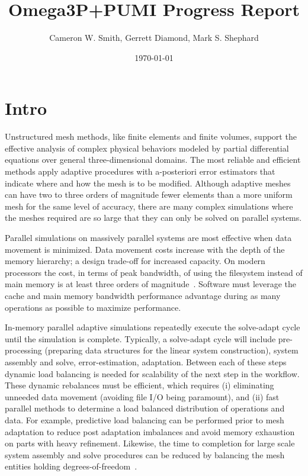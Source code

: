 \documentclass[a4paper]{article}
\title{Omega3P+PUMI Progress Report}
\author{Cameron W. Smith, Gerrett Diamond, Mark S. Shephard}
\date{\today}
\begin{document}
\maketitle
\section{Intro}

Unstructured mesh methods, like finite elements and finite volumes, support the
effective analysis of complex physical behaviors modeled by partial differential
equations over general three-dimensional domains.
The most reliable and efficient methods apply adaptive procedures with
a-posteriori error estimators that indicate where and how the mesh is to be
modified.
Although adaptive meshes can have two to three orders of magnitude fewer
elements than a more uniform mesh for the same level of accuracy, there are many
complex simulations where the meshes required are so large that they can only be
solved on parallel systems.

Parallel simulations on massively parallel systems are most effective when data
movement is minimized.
Data movement costs increase with the depth of the memory hierarchy; a design
trade-off for increased capacity.
On modern processors the cost, in terms of peak bandwidth, of using the
filesystem instead of main memory is at least three orders of
magnitude~\cite{haring2012ibm,bui2014scalable}.
Software must leverage the cache and main memory bandwidth performance advantage
during as many operations as possible to maximize performance.

In-memory parallel adaptive simulations repeatedly execute the solve-adapt cycle
until the simulation is complete.
Typically, a solve-adapt cycle will include pre-processing (preparing data
structures for the linear system construction), system assembly and solve,
error-estimation, adaptation.
Between each of these steps dynamic load balancing is needed for
scalability of the next step in the workflow.
These dynamic rebalances must be efficient, which requires (i) eliminating
unneeded data movement (avoiding file I/O being paramount), and (ii) fast
parallel methods to determine a load balanced distribution of operations and
data.
For example, predictive load balancing can be performed prior to mesh adaptation
to reduce post adaptation imbalances and avoid memory exhaustion on parts with
heavy refinement.
Likewise, the time to completion for large scale system assembly and solve
procedures can be reduced by balancing the mesh entities holding
degrees-of-freedom~\cite{SmithParma2015,zhou2012unstructured}.
\end{document}
